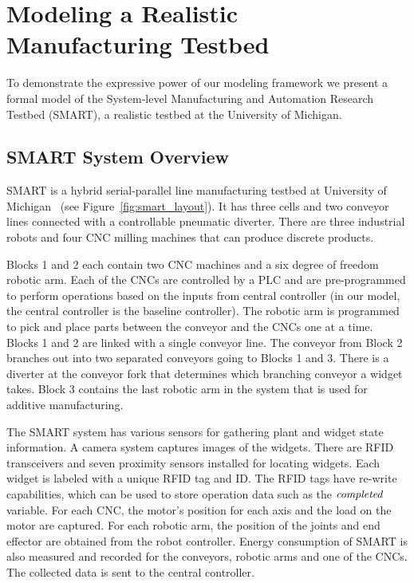 \section{Modeling a Realistic Manufacturing Testbed}
\label{sec:smart}

To  demonstrate the expressive power of our modeling framework we present a formal model of the System-level Manufacturing and Automation Research Testbed (SMART), a realistic testbed at the University of Michigan.

\subsection{SMART System Overview}
\label{subsec:smart_overview}
SMART is a hybrid serial-parallel line manufacturing testbed at University of Michigan~\cite{ilya:smart} (see Figure~\ref{fig:smart_layout}). It has three cells and two conveyor lines connected with a controllable pneumatic diverter. There are three industrial robots and four CNC milling machines that can produce discrete products.

Blocks 1 and 2 each contain two CNC machines and a six degree of freedom robotic arm.
Each of the CNCs are controlled by a PLC and are pre-programmed to perform operations based on the inputs from central controller (in our model, the central controller is the baseline controller). The robotic arm is programmed to pick and place parts between the conveyor and the CNCs one at a time. Blocks 1 and 2 are linked with a single conveyor line. The conveyor from Block 2 branches out into two separated conveyors going to Blocks 1 and 3. There is a diverter at the conveyor fork that determines which branching conveyor a widget takes. Block 3 contains the last robotic arm in the system that is used for additive manufacturing.

The SMART system has various sensors for gathering plant and widget state information. A camera system captures images of the widgets. 
There are RFID transceivers and seven proximity sensors installed for locating widgets.
Each widget is  labeled with a unique RFID tag and  ID. 
The RFID tags have re-write capabilities, which can be used to store operation data such as the $\mathit{completed}{}$ variable. 
For each CNC, the motor's position for each axis and the load on the motor are captured.
For each robotic arm, the position of the joints and end effector are obtained from the robot controller.
Energy consumption of SMART is also measured and recorded for the conveyors, robotic arms and one of the CNCs.  
The collected data is sent to the central controller.


